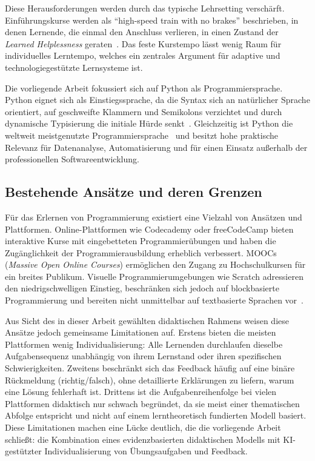 Diese Herausforderungen werden durch das typische Lehrsetting verschärft. Einführungskurse werden als \enquote{high-speed train with no brakes} beschrieben, in denen Lernende, die einmal den Anschluss verlieren, in einen Zustand der \textit{Learned Helplessness} geraten~\cite{jenkins2002}. Das feste Kurstempo lässt wenig Raum für individuelles Lerntempo, welches ein zentrales Argument für adaptive und technologiegestützte Lernsysteme ist.

Die vorliegende Arbeit fokussiert sich auf Python als Programmiersprache. Python eignet sich als Einstiegssprache, da die Syntax sich an natürlicher Sprache orientiert, auf geschweifte Klammern und Semikolons verzichtet und durch dynamische Typisierung die initiale Hürde senkt~\cite{luxton2018}. Gleichzeitig ist Python die weltweit meistgenutzte Programmiersprache~\cite{tiobe2025} und besitzt hohe praktische Relevanz für Datenanalyse, Automatisierung und für einen Einsatz außerhalb der professionellen Softwareentwicklung.


\subsection{Bestehende Ansätze und deren Grenzen}\label{subsec:bestehende-ansaetze}

Für das Erlernen von Programmierung existiert eine Vielzahl von Ansätzen und Plattformen. Online-Plattformen wie Codecademy oder freeCodeCamp bieten interaktive Kurse mit eingebetteten Programmierübungen und haben die Zugänglichkeit der Programmierausbildung erheblich verbessert. MOOCs (\textit{Massive Open Online Courses}) ermöglichen den Zugang zu Hochschulkursen für ein breites Publikum. Visuelle Programmierumgebungen wie Scratch adressieren den niedrigschwelligen Einstieg, beschränken sich jedoch auf blockbasierte Programmierung und bereiten nicht unmittelbar auf textbasierte Sprachen vor~\cite{luxton2018}.

Aus Sicht des in dieser Arbeit gewählten didaktischen Rahmens weisen diese Ansätze jedoch gemeinsame Limitationen auf. Erstens bieten die meisten Plattformen wenig Individualisierung: Alle Lernenden durchlaufen dieselbe Aufgabensequenz unabhängig von ihrem Lernstand oder ihren spezifischen Schwierigkeiten. Zweitens beschränkt sich das Feedback häufig auf eine binäre Rückmeldung (richtig/falsch), ohne detaillierte Erklärungen zu liefern, warum eine Lösung fehlerhaft ist. Drittens ist die Aufgabenreihenfolge bei vielen Plattformen didaktisch nur schwach begründet, da sie meist einer thematischen Abfolge entspricht und nicht auf einem lerntheoretisch fundierten Modell basiert. Diese Limitationen machen eine Lücke deutlich, die die vorliegende Arbeit schließt: die Kombination eines evidenzbasierten didaktischen Modells mit KI-gestützter Individualisierung von Übungsaufgaben und Feedback.


